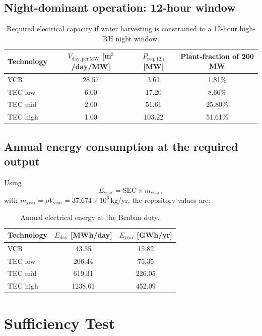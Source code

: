 \documentclass[11pt,a4paper]{article}
\begin{document}
\subsection{Night-dominant operation: 12-hour window}
\begin{table}[h]
\centering
\caption{Required electrical capacity if water harvesting is constrained to a 12-hour high-RH night window.}
\begin{tabular}{@{}lccc@{}}
\toprule
\textbf{Technology} & \textbf{$V_{\mathrm{day,per\,MW}}$ [m$^3$/day/MW]} & \textbf{$P_{\mathrm{req,12h}}$ [MW]} & \textbf{Plant-fraction of 200 MW} \\
\midrule
VCR & 28.57 & 3.61 & 1.81\% \\
TEC low & 6.00 & 17.20 & 8.60\% \\
TEC mid & 2.00 & 51.61 & 25.80\% \\
TEC high & 1.00 & 103.22 & 51.61\% \\
\bottomrule
\end{tabular}
\end{table}

\subsection{Annual energy consumption at the required output}
Using
\begin{equation}
E_{\mathrm{year}}=\mathrm{SEC}\times m_{\mathrm{year}},
\end{equation}
with $m_{\mathrm{year}}=\rho V_{\mathrm{year}}=37.674\times 10^6$\,kg/yr, the repository values are:
\begin{table}[h]
\centering
\caption{Annual electrical energy at the Benban duty.}
\begin{tabular}{@{}lcc@{}}
\toprule
\textbf{Technology} & \textbf{$E_{\mathrm{day}}$ [MWh/day]} & \textbf{$E_{\mathrm{year}}$ [GWh/yr]} \\
\midrule
VCR & 43.35 & 15.82 \\
TEC low & 206.44 & 75.35 \\
TEC mid & 619.31 & 226.05 \\
TEC high & 1238.61 & 452.09 \\
\bottomrule
\end{tabular}
\end{table}

\section{Sufficiency Test}
\end{document}
